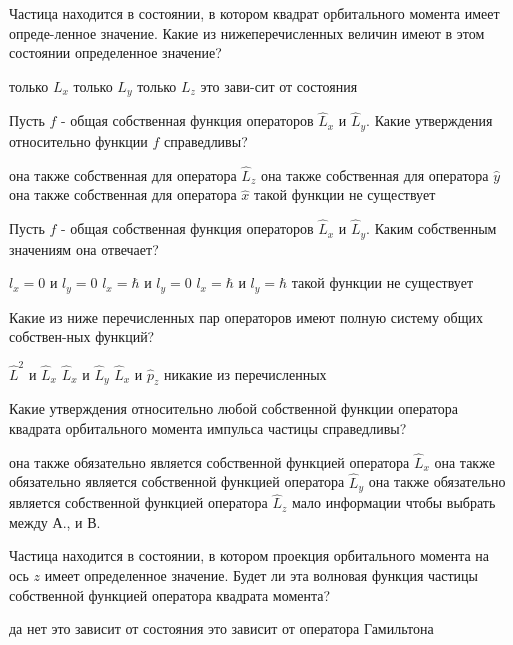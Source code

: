 \documentclass[11pt,a4paper]{exam}
\begin{document}
\begin{questions}
\question Частица находится в состоянии, в котором квадрат орбитального момента имеет опреде-ленное значение. Какие из нижеперечисленных величин имеют в этом состоянии определенное значение?
\begin{choices}
\choice только ${L_x}$    
\choice только ${L_y}$    
\choice только ${L_z}$    
\choice это зави-сит от состояния
\end{choices}

\question Пусть $f$ - общая собственная функция операторов ${\hat L_x}$ и ${\hat L_y}$. Какие утверждения относительно функции $f$ справедливы?
\begin{choices}
\choice она также собственная для оператора ${\hat L_z}$   
\choice она также собственная для оператора $\hat y$
\choice она также собственная для оператора $\hat x$ 
\choice такой функции не существует
\end{choices}

\question Пусть $f$ - общая собственная функция операторов ${\hat L_x}$ и ${\hat L_y}$. Каким собственным значениям она отвечает?
\begin{choices}
\choice ${l_x} = 0$ и ${l_y} = 0$        
\choice ${l_x} = \hbar $ и ${l_y} = 0$
\choice ${l_x} = \hbar $ и ${l_y} = \hbar $       
\choice такой функции не существует
\end{choices}

\question Какие из ниже перечисленных пар операторов имеют полную систему общих собствен-ных функций?
\begin{choices}
\choice ${\hat L^2}$ и ${\hat L_x}$      
\choice ${\hat L_x}$ и ${\hat L_y}$      
\choice ${\hat L_x}$ и ${\hat p_z}$      
\choice никакие из перечисленных
\end{choices}

\question Какие утверждения относительно любой собственной функции оператора квадрата орбитального момента импульса частицы справедливы?
\begin{choices}
\choice она также обязательно является собственной функцией оператора ${\hat L_x}$
\choice она также обязательно является собственной функцией оператора ${\hat L_y}$
\choice она также обязательно является собственной функцией оператора ${\hat L_z}$
\choice мало информации чтобы выбрать между А., 
\choice и В.
\end{choices}

\question Частица находится в состоянии, в котором проекция орбитального момента на ось $z$ имеет определенное значение. Будет ли эта волновая функция частицы собственной функцией оператора квадрата момента?
\begin{choices}
\choice да                
\choice нет
\choice это зависит от состояния      
\choice это зависит от оператора Гамильтона
\end{choices}


\end{questions}
\end{document}
